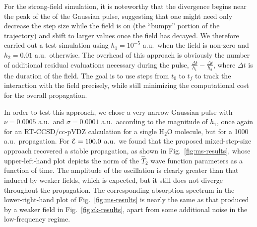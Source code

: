 For the strong-field simulation, it is noteworthy that the divergence
begins near the peak of the of the Gaussian pulse, suggesting that one
might need only decrease the step size while the field is on (the ``bumpy''
portion of the trajectory) and shift to larger values once the field has
decayed.  We therefore carried out a test simulation using $h_1 = 10^{-5}$
a.u.\ when the field is non-zero and $h_2 = 0.01$ a.u.\ otherwise.  The
overhead of this approach is obviously the number of additional residual
evaluations necessary during the pulse, $\frac{\Delta t}{h_{1}} -
\frac{\Delta t}{h_2}$, where $\Delta t$ is the duration of the
field.  The goal is to use steps from $t_{0}$ to $t_{f}$ to track the
interaction with the field precisely, while still minimizing the
computational cost for the overall propagation. 

In order to test this approach, we chose a very narrow Gaussian pulse with
$\nu=0.0005$ a.u.\ and $\sigma=0.0001$ a.u.\ according to the magnitude of
$h_{1}$, once again for an RT-CCSD/cc-pVDZ calculation for a single H$_2$O
molecule, but for a 1000 a.u.\ propagation.  For ${\cal E} = 100.0$ a.u.\
we found that the proposed mixed-step-size approach recovered a stable
propagation, as shown in Fig.~\ref{fig:ms-results}, whose upper-left-hand
plot depicts the norm of the $\hat{T}_2$ wave function parameters as a
function of time. The amplitude of the oscillation is clearly greater than
that induced by weaker fields, which is expected, but it still does not
diverge throughout the propagation. The corresponding absorption spectrum
in the lower-right-hand plot of Fig.~\ref{fig:ms-results} is nearly the
same as that produced by a weaker field in Fig.~\ref{fig:ck-results}, apart
from some additional noise in the low-frequency regime.

